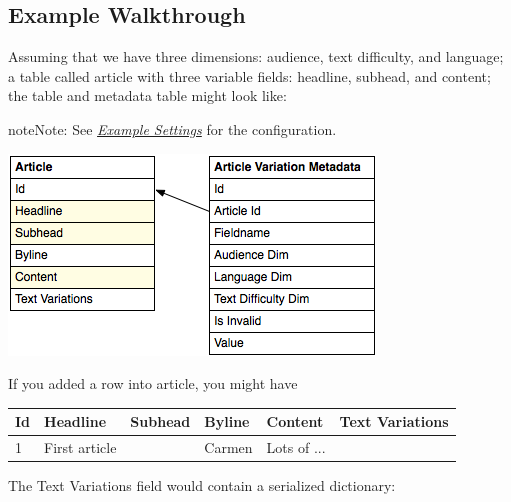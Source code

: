 \documentclass[letterpaper,10pt,english]{sphinxmanual}
\begin{document}
\subsection{Example Walkthrough}
\label{reference/implementation_notes:example-walkthrough}
Assuming that we have three dimensions: audience, text difficulty, and language; a table called article with three variable fields: headline, subhead, and content; the table and metadata table might look like:

\begin{notice}{note}{Note:}
See {\hyperref[reference/settings:settings-example]{\emph{Example Settings}}} for the configuration.
\end{notice}

\includegraphics{variations-schema-example.png}

If you added a row into article, you might have

\begin{tabulary}{\linewidth}{|L|L|L|L|L|L|}
\hline
\textbf{
Id
} & \textbf{
Headline
} & \textbf{
Subhead
} & \textbf{
Byline
} & \textbf{
Content
} & \textbf{
Text Variations
}\\
\hline

1
 & 
First article
 &  & 
Carmen
 & 
Lots of ...
 & 
\\
\hline
\end{tabulary}


The Text Variations field would contain a serialized dictionary:
\end{document}
